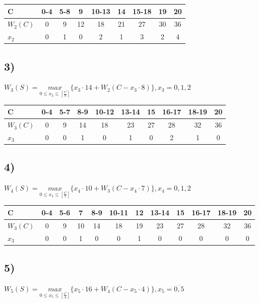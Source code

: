 \begin{center}
    \small
    \begin{tabular}{|a|c|c|c|c|c|c|c|c|}
    \hline 
    C & 0-4 & 5-8 & 9 & 10-13 & 14 & 15-18 & 19 & 20\\ \hline
    $W_2 (C)$ & 0 & 9 & 12 & 18 & 21 & 27 & 30 & 36 \\ \hline
    $x_2$ & 0 & 1 & 0 & 2 & 1 & 3 & 2 & 4 \\ \hline
    \end{tabular}
\end{center}



\subsection*{3)}
$W_3 (S)=\underset{0\le x_3 \le [\frac{C}{8}]}{max}\{x_3\cdot 14+W_2(C-x_3\cdot 8)\}, x_3=0,1,2$


\begin{flushleft}
    \small
    \begin{tabular}{|a|c|c|c|c|c|c|c|c|c|}
    \hline 
    C & 0-4 & 5-7 & 8-9 & 10-12 & 13-14 & 15 & 16-17 & 18-19 & 20\\ \hline
    $W_3 (C)$ & 0 & 9 & 14 & 18 & 23 & 27 & 28 & 32 & 36 \\ \hline
    $x_3$ & 0 & 0 & 1 & 0 & 1 & 0 & 2 & 1 & 0\\ \hline
    \end{tabular}
\end{flushleft}


\subsection*{4)}
$W_4 (S)=\underset{0\le x_4 \le [\frac{C}{7}]}{max}\{x_4\cdot 10+W_3(C-x_4\cdot 7)\}, x_4=0,1,2$

\begin{flushleft}
    \small
    \begin{tabular}{|a|c|c|c|c|c|c|c|c|c|c|c|}
    \hline 
    C & 0-4 & 5-6 & 7 & 8-9 & 10-11 & 12 & 13-14 & 15 & 16-17 & 18-19 & 20\\ \hline
    $W_3 (C)$ & 0 & 9 &  10& 14 & 18 & 19 & 23 & 27 & 28 & 32 & 36 \\ \hline
    $x_3$ & 0 & 0 & 1 & 0 & 0 & 1 & 0 & 0 & 0 & 0 & 0\\ \hline
    \end{tabular}
\end{flushleft}


\subsection*{5)}
$W_5 (S)=\underset{0\le x_5 \le [\frac{C}{4}]}{max}\{x_5\cdot 16+W_4(C-x_5\cdot 4)\}, x_5=\overline{0,5}$

